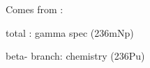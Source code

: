 Comes from :

total : gamma spec (236mNp)

beta- branch:  chemistry (236Pu)




% 
% 
% 
% 
% 
% 
% 
% 
% 
% 
